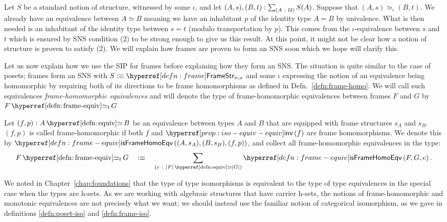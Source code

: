 Let $S$ be a standard notion of structure, witnessed by some $\iota$, and let
$(A, s), (B, t):\sum_{(A~:~\mathcal{U}{})} S(A)$. Suppose that $(A, s) \simeq_\iota (B, t)$.
We already have an equivalence between $A \simeq B$ meaning we have an inhabitant $p$ of the
identity type $A = B$ by univalence. What is then needed is an inhabitant of the identity
type between $s = t$ (modulo transportation by $p$). This comes from the $\iota$-equivalence
between $s$ and $t$ which is ensured by SNS condition (2) to be strong enough to give us
this result. At this point, it might not be clear how a notion of structure is proven to
satisfy (2). We will explain how frames are proven to form an SNS soon which we hope will
clarify this.

Let us now explain how we use the SIP for frames before explaining how they form an SNS.
The situation is quite similar to the case of posets; frames form an SNS with $S \is
\framestrnm{}_{n, o}$ and some $\iota$ expressing the notion of an equivalence being
homomorphic by requiring both of its directions to be frame homomorphisms as defined in
Defn.~\ref{defn:frame-homo}. We will call such equivalences
\emph{frame-homomorphic equivalences} and will denote the type of frame-homomorphic
equivalences between frames $F$ and $G$ by $\frameequiv{F}{G}$

\begin{defn}\label{defn:frame-equiv}
  Let $\oftyI{(f , p)}{\typequiv{A}{B}}$ be an equivalence between types $A$ and $B$ that
  are equipped with frame structures $s_A$ and $s_B$. $(f, p)$ is called frame-homomorphic
  if both $f$ and $\invequiv{f}$ are frame homomorphisms. We denote this by
  $\isframehomoeqv{(A, s_A), (B, s_B), (f, p)}$, and collect all frame-homomorphic
  equivalences in the type:
  \begin{equation*}
    \frameequiv{F}{G} \quad\is\quad
      \sigmaty{e}{\typequiv{\abs{F}}{\abs{G}}}{\isframehomoeqv{F, G, e}}.
  \end{equation*}
\end{defn}

We noted in Chapter~\ref{chap:foundations} that the type of type isomorphisms is
equivalent to the type of type equivalences in the special case when the types are h-sets.
As we are working with algebraic structures that have carrier h-sets, the notions of
frame-homomorphic and monotonic equivalences are not precisely what we want; we should
instead use the familiar notion of categorical isomorphism, as we gave in definitions
\ref{defn:poset-iso} and \ref{defn:frame-iso}.

